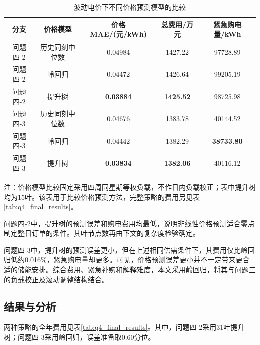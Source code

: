 \begin{table}[H]
    \centering
    \caption{波动电价下不同价格预测模型的比较}
    \label{tab:q4_price_comparison}
    \begin{tabular}{ccccc}
        \hline
        分支 & 价格模型 & 价格MAE/(元/kWh) & 总费用/万元 & 紧急购电量/kWh \\
        \hline
        问题四-2 & 历史同刻中位数 & 0.04984 & 1427.22 & 97728.89 \\
        问题四-2 & 岭回归 & 0.04472 & 1426.64 & 99205.19 \\
        问题四-2 & 提升树 & \textbf{0.03884} & \textbf{1425.52} & 98725.98 \\
        \hline
        问题四-3 & 历史同刻中位数 & 0.04676 & 1383.78 & 40144.52 \\
        问题四-3 & 岭回归 & 0.04442 & 1382.29 & \textbf{38733.80} \\
        问题四-3 & 提升树 & \textbf{0.03834} & \textbf{1382.06} & 40116.12 \\
        \hline
    \end{tabular}
    \par\smallskip
    \begin{minipage}{0.96\textwidth}
    \small 注：价格模型比较固定采用四周同星期等权负载，不作日内负载校正；表中提升树均为15叶。该表用于比较价格预测方法，完整策略的费用另见表\ref{tab:q4_final_results}。
    \end{minipage}
\end{table}

问题四-2中，提升树的预测误差和购电费用均最低，说明非线性价格预测适合零点制定整日订单的条件。其叶节点数再由下文的复杂度检验确定。

问题四-3中，提升树的预测误差更小，但在上述相同供需条件下，其费用仅比岭回归低约0.016\%，紧急购电量却更多。可见，价格预测误差更小并不一定带来更合适的储能安排。综合费用、紧急补购和解释难度，本文采用岭回归，将其与问题三的负载校正及滚动调整结构结合。

\subsection{结果与分析}

两种策略的全年费用见表\ref{tab:q4_final_results}。其中，问题四-2采用31叶提升树；问题四-3采用岭回归，误差准备取0.60分位。

